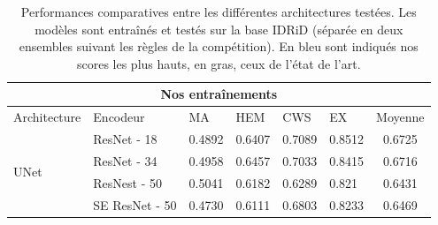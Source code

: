 \begin{table}
	\centering
	\caption {Performances comparatives entre les différentes architectures testées. Les modèles sont entraînés et testés sur la base \ac{IDRiD} (séparée en deux ensembles suivant les règles de la compétition). En bleu sont indiqués nos scores les plus hauts, en gras, ceux de l'état de l'art.}
	\label{tab:perfComparéeSegmentation}
	\begin{threeparttable}
		\begin{tabular}{l lllll c}
			\toprule
			\multicolumn{7}{c}{Nos entraînements} \\
			\midrule
			Architecture & Encodeur & \ac{MA} & \ac{HEM} & \ac{CWS} & \ac{EX} & Moyenne\\
			\midrule
			\multirow{5}{3em}{UNet \cite{ronnebergerUNetConvolutionalNetworks2015a}}
			& ResNet - 18 \cite{zagoruykoWideResidualNetworks2016} & 0.4892 & 0.6407 & 0.7089 & 0.8512 & 0.6725 \\
			& ResNet - 34 & 0.4958 & 0.6457 & 0.7033 & 0.8415 & 0.6716 \\
			& ResNest - 50 \cite{zhangResNeStSplitAttentionNetworks2022} & 0.5041 & 0.6182 & 0.6289 & 0.821 & 0.6431 \\
			& SE ResNet - 50 \cite{huSqueezeandExcitationNetworks2018} & 0.4730 & 0.6111 & 0.6803 & 0.8233 & 0.6469 \\


\end{tabular}
\end{threeparttable}
\end{table}

